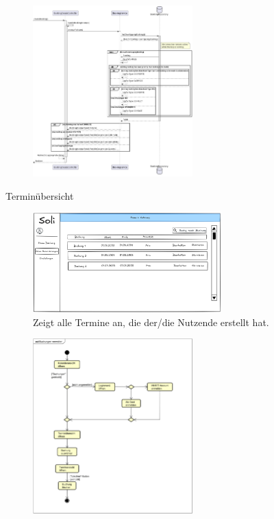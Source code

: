 \documentclass{sdqbeamer}
\begin{document}
\begin{frame}[plain]
    \begin{figure}
        \centering
        \includegraphics[width=0.55\textwidth]{pictures/figures/activity/SequenzdiagrammBuchungErstellen}
        \label{fig:terminerstellensequenz}
    \end{figure}
\end{frame}

\begin{frame}{Terminübersicht}
    \begin{figure}
        \centering
        \includegraphics[width=0.65\textwidth]{pictures/figures/ui/reservierungsuebersicht}
        \caption{Zeigt alle Termine an, die der/die Nutzende erstellt hat.}
        \label{fig:terminuebersicht}
    \end{figure}
\end{frame}

\begin{frame}[plain]
    \begin{figure}
        \centering
        \includegraphics[width=0.55\textwidth]{pictures/figures/activity/buchungverwalten}
        \label{fig:terminuebersichtprozess}
    \end{figure}
\end{frame}
\end{document}
